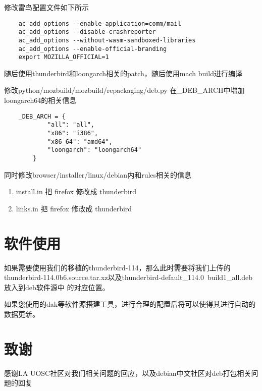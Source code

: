 \documentclass[lang=cn,a4paper,newtx]{elegantpaper}
\begin{document}
修改雷鸟配置文件如下所示
\begin{lstlisting} 
    ac_add_options --enable-application=comm/mail
    ac_add_options --disable-crashreporter
    ac_add_options --without-wasm-sandboxed-libraries
    ac_add_options --enable-official-branding
    export MOZILLA_OFFICIAL=1
\end{lstlisting}

随后使用thunderbird和loongarch相关的patch，随后使用mach build进行编译

修改python/mozbuild/mozbuild/repackaging/deb.py 在\_DEB\_ARCH中增加loongarch64的相关信息

\begin{lstlisting}
    _DEB_ARCH = {
            "all": "all",
            "x86": "i386",
            "x86_64": "amd64",
            "loongarch": "loongarch64"
        }
\end{lstlisting}

同时修改browser/installer/linux/debian内和rules相关的信息
\begin{enumerate}
    \item install.in 把 firefox 修改成 thunderbird
    \item links.in 把 firefox 修改成 thunderbird
\end{enumerate}

\section{软件使用}

如果需要使用我们的移植的thunderbird-114，那么此时需要将我们上传的
thunderbird-114.0b6.source.tar.xz以及thunderbird-default\_114.0~build1\_all.deb放入到deb软件源中
的对应位置。

如果您使用的dak等软件源搭建工具，进行合理的配置后将可以使得其进行自动的数据更新。
\section{致谢}

感谢LA UOSC社区对我们相关问题的回应，以及debian中文社区对deb打包相关问题的回复

\nocite{*}
\printbibliography[heading=bibintoc, title=\ebibname]

\appendix
\addappheadtotoc
\end{document}
